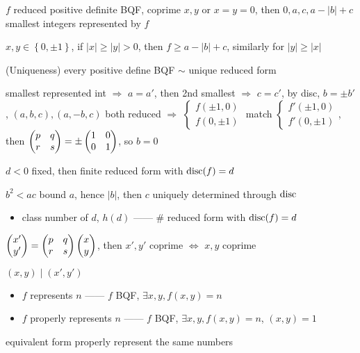 \begin{lemma}
    $f$ reduced positive definite BQF, coprime $x, y$ or $x = y = 0$, then $0, a, c, a - |b| + c$ smallest integers represented by $f$
\end{lemma}
\begin{pf}
    $x, y \in \left\{ 0, \pm 1 \right\}$, if $|x| \geq |y| > 0$, then $f \geq a - |b| + c$, similarly for $|y| \geq |x|$
\end{pf}

\begin{thm}(Uniqueness)
    every positive define BQF $\sim$ unique reduced form
\end{thm}
\begin{pf}
    smallest represented int $\Rightarrow$ $a = a'$, then 2nd smallest $\Rightarrow$ $c = c'$, by disc, $b = \pm b'$,
    $(a, b, c), (a, -b, c)$ both reduced $\Rightarrow$ $\begin{cases}
         f(\pm 1, 0)\\
         f(0, \pm 1)
    \end{cases}$ match $\begin{cases}
           f'(\pm 1, 0)\\
                            f'(0, \pm 1)
    \end{cases}$, then $\begin{pmatrix} p & q \\ r & s \end{pmatrix} = \pm \begin{pmatrix} 1 & 0 \\ 0 & 1 \end{pmatrix}$, so $b= 0$
\end{pf}

\begin{prop}
    $d < 0$ fixed, then finite reduced form with $\textnormal{disc}(f) = d$
\end{prop}
\begin{pf}
    $b^2 < ac$ bound $a$, hence $|b|$, then $c$ uniquely determined through $\textnormal{disc}$
\end{pf}

\begin{itemize}
    \item class number of $d$, $h(d)$ ------ \# reduced form with $\textnormal{disc}(f) = d$
\end{itemize}

\begin{lemma}
    $\begin{pmatrix} x' \\ y' \end{pmatrix} = \begin{pmatrix} p & q \\ r & s \end{pmatrix} \begin{pmatrix} x \\ y \end{pmatrix}$, then $x', y'$ coprime $\iff$ $x, y$ coprime
\end{lemma}
\begin{pf}
    $(x, y) \mid (x', y')$
\end{pf}

\begin{itemize}
    \item $f$ represents $n$ ------ $f$ BQF, $\exists x, y, f(x, y) = n$
    \item $f$ properly represents $n$ ------ $f$ BQF, $\exists x, y, f(x, y) = n$, $(x, y) = 1$
\end{itemize}
\begin{fact}
    equivalent form properly represent the same numbers
\end{fact}


